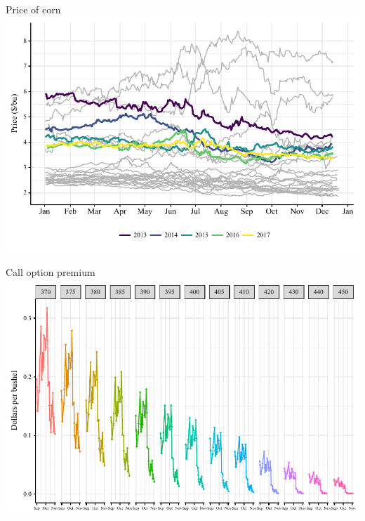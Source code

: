 \documentclass[table,xcolor=pdftex,dvipsnames]{beamer}\usepackage[]{graphicx}\usepackage[]{color}
\makeatletter
\def\maxwidth{ %
  \ifdim\Gin@nat@width>\linewidth
    \linewidth
  \else
    \Gin@nat@width
  \fi
}
\newenvironment{knitrout}{}{} %
\makeatother
\begin{document}



\begin{frame}{Price of corn}
\begin{knitrout}
\color{fgcolor}
\includegraphics[width=\maxwidth]{figure/figure_corn_futures-1} 

\end{knitrout}
\end{frame}
 
 
\begin{frame}{Call option premium}
\begin{knitrout}
\color{fgcolor}
\includegraphics[width=\maxwidth]{figure/call_premium-1} 

\end{knitrout}
\end{frame}
 
\end{document}
